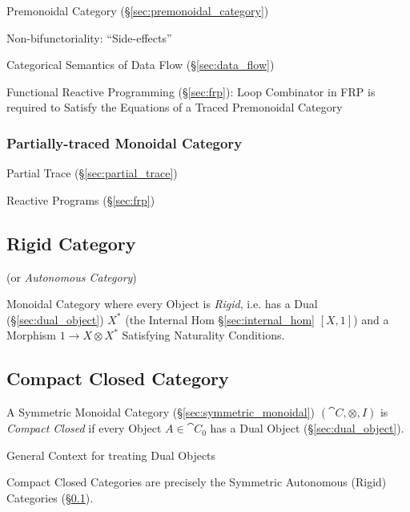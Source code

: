 Premonoidal Category (\S\ref{sec:premonoidal_category})

Non-bifunctoriality: ``Side-effects'' \cite{jacobs-heunen-hasuo09}

Categorical Semantics of Data Flow (\S\ref{sec:data_flow})

Functional Reactive Programming (\S\ref{sec:frp}): Loop Combinator in
FRP is required to Satisfy the Equations of a Traced Premonoidal
Category



\subsubsection{Partially-traced Monoidal Category}
\label{sec:partially_traced}

Partial Trace (\S\ref{sec:partial_trace})

Reactive Programs (\S\ref{sec:frp})



\subsection{Rigid Category}\label{sec:rigid_category}

(or \emph{Autonomous Category})

Monoidal Category where every Object is \emph{Rigid}, i.e. has a Dual
(\S\ref{sec:dual_object}) $X^*$ (the Internal Hom
\S\ref{sec:internal_hom} $[X,1]$) and a Morphism $1 \rightarrow
X \otimes X^*$ Satisfying Naturality Conditions.



\subsection{Compact Closed Category}\label{sec:compact_closed}

A Symmetric Monoidal Category (\S\ref{sec:symmetric_monoidal})
$(\cat{C}, \otimes, I)$ is \emph{Compact Closed} if every Object $A
\in \cat{C}_0$ has a Dual Object (\S\ref{sec:dual_object}).

General Context for treating Dual Objects

Compact Closed Categories are precisely the Symmetric Autonomous
(Rigid) Categories (\S\ref{sec:rigid_category}).

